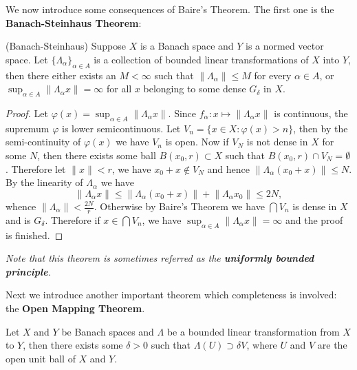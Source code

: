 We now introduce some consequences of Baire's Theorem. The first one is the \textbf{Banach-Steinhaus Theorem}:
\begin{theorem}(Banach-Steinhaus)
Suppose $X$ is a Banach space and $Y$ is a normed vector space. Let $\{\Lambda_\alpha\}_{\alpha\in A}$ is a collection of bounded linear transformations of $X$ into $Y$, then there either exists an $M<\infty$ such that $\|\Lambda_\alpha\|\le M$ for every $\alpha\in A$, or $\sup_{\alpha\in A}\|\Lambda_\alpha x\|=\infty$ for all $x$ belonging to some dense $G_\delta$ in $X$.
\end{theorem}
\begin{proof}
Let $\varphi(x)=\sup_{\alpha\in A}\|\Lambda_\alpha x\|$. Since $f_\alpha:x\mapsto\|\Lambda_\alpha x\|$ is continuous, the supremum $\varphi$ is lower semicontinuous. Let $V_n=\{x\in X:\varphi(x)>n\}$, then by the semi-continuity of $\varphi(x)$ we have $V_n$ is open. Now if $V_N$ is not dense in $X$ for some $N$, then there exists some ball $B(x_0,r)\subset X$ such that $B(x_0,r)\cap V_N=\emptyset$. Therefore let $\|x\|<r$, we have $x_0+x\notin V_N$ and hence $\|\Lambda_\alpha(x_0+x)\|\le N$. By the linearity of $\Lambda_\alpha$ we have 
$$
\left\| \Lambda _{\alpha}x \right\| \le \left\| \Lambda _{\alpha}\left( x_0+x \right) \right\| +\left\| \Lambda _{\alpha}x_0 \right\| \le 2N,
$$
whence $\|\Lambda_\alpha\|<\frac{2N}{r}$. Otherwise by Baire's Theorem we have $\bigcap V_n$ is dense in $X$ and is $G_\delta$. Therefore if $x\in\bigcap V_n$, we have $\sup_{\alpha\in A}\|\Lambda_\alpha x\|=\infty$ and the proof is finished.
\end{proof}
\begin{note}\em
Note that this theorem is sometimes referred as the \textbf{uniformly bounded principle}.
\end{note}
Next we introduce another important theorem which completeness is involved: the \textbf{Open Mapping Theorem}.
\begin{theorem}
Let $X$ and $Y$ be Banach spaces and $\Lambda$ be a bounded linear transformation from $X$ to $Y$, then there exists some $\delta>0$ such that $\Lambda(U)\supset\delta V$, where $U$ and $V$ are the open unit ball of $X$ and $Y$.
\end{theorem}
